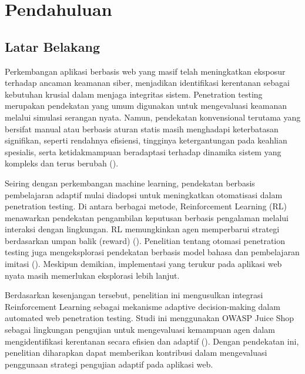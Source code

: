 \chapter{Pendahuluan}

\section{Latar Belakang}

Perkembangan aplikasi berbasis web yang masif telah meningkatkan eksposur terhadap ancaman keamanan siber, menjadikan identifikasi kerentanan sebagai kebutuhan krusial dalam menjaga integritas sistem. Penetration testing merupakan pendekatan yang umum digunakan untuk mengevaluasi keamanan melalui simulasi serangan nyata. Namun, pendekatan konvensional terutama yang bersifat manual atau berbasis aturan statis masih menghadapi keterbatasan signifikan, seperti rendahnya efisiensi, tingginya ketergantungan pada keahlian spesialis, serta ketidakmampuan beradaptasi terhadap dinamika sistem yang kompleks dan terus berubah (\cite{ghanem2023hrl,zennaro2023}).

Seiring dengan perkembangan machine learning, pendekatan berbasis pembelajaran adaptif mulai diadopsi untuk meningkatkan otomatisasi dalam penetration testing. Di antara berbagai metode, Reinforcement Learning (RL) menawarkan pendekatan pengambilan keputusan berbasis pengalaman melalui interaksi dengan lingkungan. RL memungkinkan agen memperbarui strategi berdasarkan umpan balik (reward) (\cite{alavizadeh2022,nguyen2023}). Penelitian tentang otomasi penetration testing juga mengeksplorasi pendekatan berbasis model bahasa dan pembelajaran imitasi (\cite{deng2024pentestgpt,chen2023gailpt}). Meskipun demikian, implementasi yang terukur pada aplikasi web nyata masih memerlukan eksplorasi lebih lanjut.

Berdasarkan kesenjangan tersebut, penelitian ini mengusulkan integrasi Reinforcement Learning sebagai mekanisme adaptive decision-making dalam automated web penetration testing. Studi ini menggunakan OWASP Juice Shop sebagai lingkungan pengujian untuk mengevaluasi kemampuan agen dalam mengidentifikasi kerentanan secara efisien dan adaptif (\cite{owaspJuiceShop}). Dengan pendekatan ini, penelitian diharapkan dapat memberikan kontribusi dalam mengevaluasi penggunaan strategi pengujian adaptif pada aplikasi web.

